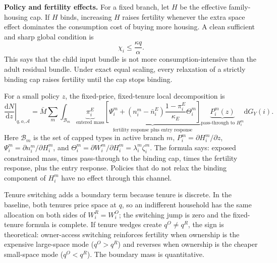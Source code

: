 \documentclass[10pt]{article}
\newcommand{\dd}{\mathrm d}
\newcommand{\1}{\mathbf 1}
\begin{document}
\textbf{Policy and fertility effects.}
For a fixed branch, let \(H\) be the effective family-housing cap. If \(H\) binds, increasing \(H\) raises fertility whenever the extra space effect dominates the consumption cost of buying more housing. A clean sufficient and sharp global condition is
\[
\chi_i\le\frac{\kappa q}{\alpha}.
\]
This says that the child input bundle is not more consumption-intensive than the adult residual bundle. Under exact equal scaling, every relaxation of a strictly binding cap raises fertility until the cap stops binding.

For a small policy \(z\), the fixed-price, fixed-tenure local decomposition is
\[
\left.\frac{\dd N}{\dd z}\right|_{q,o,\mathcal A}
=
\bar M\sum_m\int_{\mathcal B_m}
\underbrace{\pi_i^E}_{\text{entered mass}}
\underbrace{\left[\Psi_i^m+(n_i^m-\bar n_i^E)\frac{1-\pi_i^E}{\kappa_E}\Theta_i^m\right]}_{\text{fertility response plus entry response}}
\underbrace{P_i^m(z)}_{\text{pass-through to }H_i^m}
\dd G_Y(i).
\]
Here \(\mathcal B_m\) is the set of capped types in active branch \(m\), \(P_i^m=\partial H_i^m/\partial z\), \(\Psi_i^m=\partial n_i^m/\partial H_i^m\), and \(\Theta_i^m=\partial W_i^m/\partial H_i^m=\lambda_i^m\zeta_i^m\). The formula says: exposed constrained mass, times pass-through to the binding cap, times the fertility response, plus the entry response. Policies that do not relax the binding component of \(H_i^m\) have no effect through this channel.

Tenure switching adds a boundary term because tenure is discrete. In the baseline, both tenures price space at \(q\), so an indifferent household has the same allocation on both sides of \(W_i^R=W_i^O\); the switching jump is zero and the fixed-tenure formula is complete. If tenure wedges create \(q^O\ne q^R\), the sign is theoretical: owner-access switching reinforces fertility when ownership is the expensive large-space mode (\(q^O>q^R\)) and reverses when ownership is the cheaper small-space mode (\(q^O<q^R\)). The boundary mass is quantitative.
\end{document}
